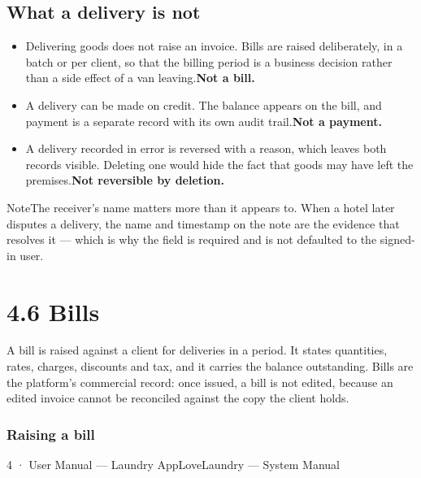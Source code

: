 \documentclass[11pt,a4paper,oneside]{book}
\begin{document}
\subsection*{What a delivery is not}
\begin{itemize}
\item Delivering goods does not raise an invoice. Bills are raised deliberately, in a batch or per client, so that the billing period is a business decision rather than a side effect of a van leaving.\textbf{Not a bill.}
\item A delivery can be made on credit. The balance appears on the bill, and payment is a separate record with its own audit trail.\textbf{Not a payment.}
\item A delivery recorded in error is reversed with a reason, which leaves both records visible. Deleting one would hide the fact that goods may have left the premises.\textbf{Not reversible by deletion.}
\end{itemize}
\begin{notebox}NoteThe receiver's name matters more than it appears to. When a hotel later disputes a delivery, the name and timestamp on the note are the evidence that resolves it — which is why the field is required and is not defaulted to the signed-in user.\end{notebox}
\section{4.6 Bills}
A bill is raised against a client for deliveries in a period. It states quantities, rates, charges, discounts and tax, and it carries the balance outstanding. Bills are the platform's commercial record: once issued, a bill is not edited, because an edited invoice cannot be reconciled against the copy the client holds.

\subsubsection*{Raising a bill}
4 · User Manual — Laundry AppLoveLaundry — System Manual
\end{document}

